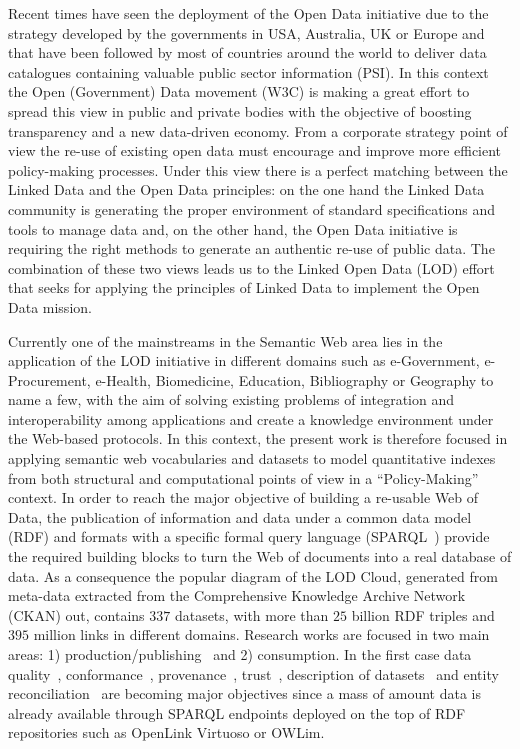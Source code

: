 Recent times have seen the deployment of the Open Data initiative due to the strategy 
developed by the governments in USA, Australia, UK or Europe and that have been followed by most of countries around the world to deliver data 
catalogues containing valuable public sector information (PSI). In this context the Open (Government) Data movement (W3C) is making a great effort 
to spread this view in public and private bodies with the objective of boosting transparency and a new data-driven economy. 
From a corporate strategy point of view the re-use of existing open data must encourage and improve 
more efficient policy-making processes. Under this view there is a perfect matching between the Linked Data and the Open Data 
principles: on the one hand the Linked Data community is generating the proper environment of standard 
specifications and tools to manage data and, on the other hand, the Open Data initiative is requiring 
the right methods to generate an authentic re-use of public data. The combination of these 
two views leads us to the Linked Open Data (LOD) effort that seeks for applying the principles of Linked Data to implement the Open Data mission.

Currently one of the mainstreams in the Semantic Web area lies in the application of the LOD initiative in 
different domains such as  e-Government, e-Procurement, e-Health, Biomedicine, Education, Bibliography or Geography to name a few,  
with the aim of solving existing problems of integration and interoperability among applications and create a 
knowledge environment under the Web-based protocols. In this context, the present work is therefore focused 
in applying semantic web vocabularies and datasets to model quantitative indexes from both structural 
and computational points of view in a ``Policy-Making'' context. In order to reach the major objective of building a re-usable Web of Data,  
the publication of information and data under a common data model (RDF) and formats with 
a specific formal query language (SPARQL~\cite{Sparql11}) provide the required building blocks to turn 
the Web of documents into a real database of data. As a consequence the popular 
diagram of the LOD Cloud, generated from meta-data extracted from the Comprehensive Knowledge Archive Network (CKAN) out, 
contains $337$ datasets, with more than $25$ billion RDF triples and $395$ million links in different  domains. 
Research works are focused in two main areas: 1) production/publishing~\cite{bizer07how} and 2) consumption. 
In the first case data quality~\cite{wiqa,lodq}, conformance~\cite{HoganUHCPD:2012:237}, 
provenance~\cite{w3c-prov}, trust~\cite{Carroll05namedgraphs}, description of datasets~\cite{void} and 
entity reconciliation~\cite{Maali_Cyganiak_2011} are becoming major objectives since a mass of amount data is already available 
through SPARQL endpoints deployed on the top of RDF repositories such as OpenLink Virtuoso or OWLim. 


